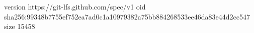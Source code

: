 version https://git-lfs.github.com/spec/v1
oid sha256:99348b7755ef752ea7ad0c1a10979382a75bb884268533ee46da83e44d2cc547
size 15458

